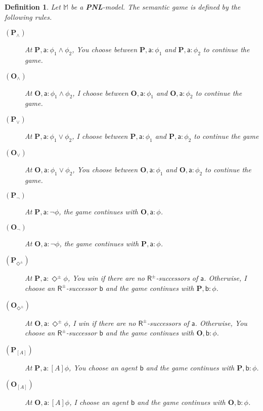 \documentclass{easychair}
\newcommand{\I}{\emph{I}\xspace}
\newcommand{\You}{\emph{You}\xspace}
\newcommand{\M}{\mathbb{M}}
\newcommand{\R}{\mathsf{R}}
\newcommand{\ag}{\mathsf{a}}
\renewcommand{\b}{\mathsf{b}}
\newtheorem{definition}{Definition}
\newcommand{\PNL}{\textbf{PNL}}
\begin{document}
\begin{definition}
    Let $\M$ be a \PNL-model. The semantic game is defined by the following rules. 

\begin{description}
\item[$(\mathbf{P}_\wedge)$] At $\mathbf{P}, \ag: \phi_1\wedge \phi_2$, \You
    choose between  $\mathbf{P},\ag:\phi_1$ and 
    $\mathbf{P},\ag:\phi_2$ to continue the game. 
\item[$(\mathbf{O}_\wedge)$] \vspace{-2mm}At $\mathbf{O}, \ag:
    \phi_1\wedge \phi_2$, \I choose between $\mathbf{O},\ag:\phi_1$
    and $\mathbf{O},\ag:\phi_2$ to continue the game. 

\item[$(\mathbf{P}_\vee)$] At $\mathbf{P}, \ag: \phi_1\vee \phi_2$, \I choose between $\mathbf{P},\ag:\phi_1$ and $\mathbf{P},\ag:\phi_2$ to continue the game
\item[$(\mathbf{O}_\vee)$] \vspace{-2mm}At $\mathbf{O}, \ag: \phi_1\vee \phi_2$, \You choose between $\mathbf{O},\ag:\phi_1$ and $\mathbf{O},\ag:\phi_2$ to continue the game.

\item[$(\mathbf{P}_\neg)$] At $\mathbf{P}, \ag: \neg \phi$, the game continues with $\mathbf{O}, \ag: \phi$.
\item[$(\mathbf{O}_\neg)$] \vspace{-2mm}At $\mathbf{O}, \ag: \neg \phi$, the game continues with $\mathbf{P},\ag: \phi$.

\item[$(\mathbf{P}_{\Diamond^\pm})$] At $\mathbf{P}, \ag: \Diamond^\pm \phi$, \You win if there are no $\R^\pm$-successors of $\ag$. Otherwise, \I choose an $\R^\pm$-successor $\b$ and the game continues with $\mathbf{P},\b:\phi$.
\item[$(\mathbf{O}_{\Diamond^\pm})$] \vspace{-2mm} At $\mathbf{O},\ag: \Diamond^\pm \phi$, \I win if there are no $\R^\pm$-successors of $\ag$. Otherwise, \You choose an $\R^\pm$-successor $\b$ and the game continues with $\mathbf{O},\b:\phi$.



\item[$(\mathbf{P}_{[A]})$] At $\mathbf{P},\ag :  [A]\phi$, \You choose an agent $\b$ and the game continues with $\mathbf{P},\b:\phi$.
\item[$(\mathbf{O}_{[A]})$] \vspace{-2mm}At $\mathbf{O},\ag :  [A]\phi$, \I choose an agent $\b$ and the game continues with $\mathbf{O},\b:\phi$.


\end{description}
\end{definition}
\end{document}
